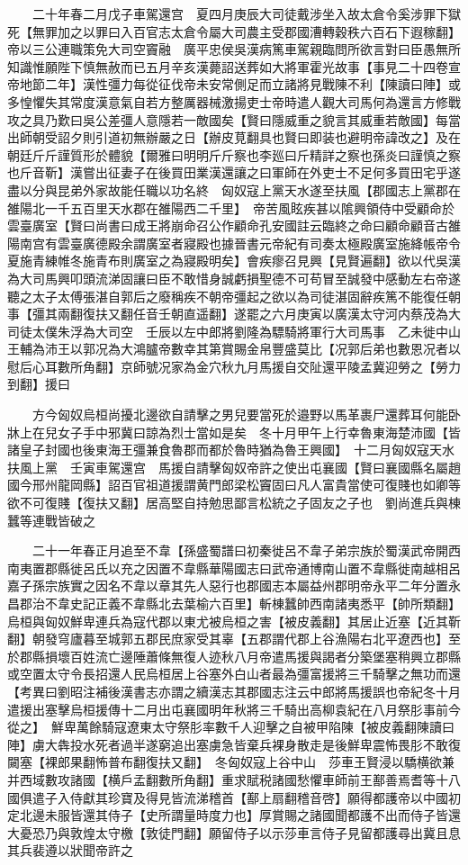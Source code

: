 　　二十年春二月戊子車駕還宫　夏四月庚辰大司徒戴涉坐入故太倉令奚涉罪下獄死【無罪加之以罪曰入百官志太倉令屬大司農主受郡國漕轉穀秩六百石下遐稼翻】帝以三公連職策免大司空竇融　廣平忠侯吳漢病篤車駕親臨問所欲言對曰臣愚無所知識惟願陛下慎無赦而已五月辛亥漢薨詔送葬如大將軍霍光故事【事見二十四卷宣帝地節二年】漢性彊力每從征伐帝未安常側足而立諸將見戰陳不利【陳讀曰陣】或多惶懼失其常度漢意氣自若方整厲器械激揚吏士帝時遣人觀大司馬何為還言方修戰攻之具乃歎曰吳公差彊人意隱若一敵國矣【賢曰隱威重之貌言其威重若敵國】每當出師朝受詔夕則引道初無辦嚴之日【辦皮莧翻具也賢曰即装也避明帝諱改之】及在朝廷斤斤謹質形於體貌【爾雅曰明明斤斤察也李廵曰斤精詳之察也孫炎曰謹慎之察也斤音靳】漢嘗出征妻子在後買田業漢還讓之曰軍師在外吏士不足何多買田宅乎遂盡以分與昆弟外家故能任職以功名終　匈奴寇上黨天水遂至扶風【郡國志上黨郡在雒陽北一千五百里天水郡在雒陽西二千里】　帝苦風眩疾甚以隂興領侍中受顧命於雲臺廣室【賢曰尚書曰成王將崩命召公作顧命孔安國註云臨終之命曰顧命顧音古雒陽南宫有雲臺廣德殿余謂廣室者寢殿也據晉書元帝紀有司奏太極殿廣室施絳帳帝令夏施青練帷冬施青布則廣室之為寢殿明矣】會疾瘳召見興【見賢遍翻】欲以代吳漢為大司馬興叩頭流涕固讓曰臣不敢惜身誠虧損聖德不可苟冒至誠發中感動左右帝遂聽之太子太傅張湛自郭后之廢稱疾不朝帝彊起之欲以為司徒湛固辭疾篤不能復任朝事【彊其兩翻復扶又翻任音壬朝直遥翻】遂罷之六月庚寅以廣漢太守河内蔡茂為大司徒太僕朱浮為大司空　壬辰以左中郎將劉隆為驃騎將軍行大司馬事　乙未徙中山王輔為沛王以郭况為大鴻臚帝數幸其第賞賜金帛豐盛莫比【况郭后弟也數恩况者以慰后心耳數所角翻】京師號况家為金穴秋九月馬援自交阯還平陵孟冀迎勞之【勞力到翻】援曰

　　方今匈奴烏桓尚擾北邊欲自請擊之男兒要當死於邉野以馬革裹尸還葬耳何能卧牀上在兒女子手中邪冀曰諒為烈士當如是矣　冬十月甲午上行幸魯東海楚沛國【皆諸皇子封國也後東海王彊兼食魯郡而都於魯時猶為魯王興國】　十二月匈奴寇天水扶風上黨　壬寅車駕還宫　馬援自請擊匈奴帝許之使出屯襄國【賢曰襄國縣名屬趙國今邢州龍岡縣】詔百官祖道援謂黄門郎梁松竇固曰凡人富貴當使可復賤也如卿等欲不可復賤【復扶又翻】居高堅自持勉思鄙言松統之子固友之子也　劉尚進兵與棟蠶等連戰皆破之

　　二十一年春正月追至不韋【孫盛蜀譜曰初秦徙呂不韋子弟宗族於蜀漢武帝開西南夷置郡縣徙呂氏以充之因置不韋縣華陽國志曰武帝通博南山置不韋縣徙南越相呂嘉子孫宗族實之因名不韋以章其先人惡行也郡國志本屬益州郡明帝永平二年分置永昌郡治不韋史記正義不韋縣北去葉榆六百里】斬棟蠶帥西南諸夷悉平【帥所類翻】　烏桓與匈奴鮮卑連兵為寇代郡以東尤被烏桓之害【被皮義翻】其居止近塞【近其靳翻】朝發穹廬暮至城郭五郡民庶家受其辜【五郡謂代郡上谷漁陽右北平遼西也】至於郡縣損壞百姓流亡邊陲蕭條無復人迹秋八月帝遣馬援與謁者分築堡塞稍興立郡縣或空置太守令長招還人民烏桓居上谷塞外白山者最為彊富援將三千騎擊之無功而還　【考異曰劉昭注補後漢書志亦謂之續漢志其郡國志注云中郎將馬援誤也帝紀冬十月遣援出塞擊烏桓援傳十二月出屯襄國明年秋將三千騎出高柳袁紀在八月祭肜事前今從之】　鮮卑萬餘騎寇遼東太守祭肜率數千人迎擊之自被甲陷陳【被皮義翻陳讀曰陣】虜大犇投水死者過半遂窮追出塞虜急皆棄兵裸身散走是後鮮卑震怖畏肜不敢復闚塞【裸郎果翻怖普布翻復扶又翻】　冬匈奴寇上谷中山　莎車王賢浸以驕横欲兼并西域數攻諸國【横戶孟翻數所角翻】重求賦税諸國愁懼車師前王鄯善焉耆等十八國俱遣子入侍獻其珍寶及得見皆流涕稽首【鄯上扇翻稽音啓】願得都護帝以中國初定北邊未服皆還其侍子【史所謂量時度力也】厚賞賜之諸國聞都護不出而侍子皆還大憂恐乃與敦煌太守檄【敦徒門翻】願留侍子以示莎車言侍子見留都護尋出冀且息其兵裴遵以狀聞帝許之

